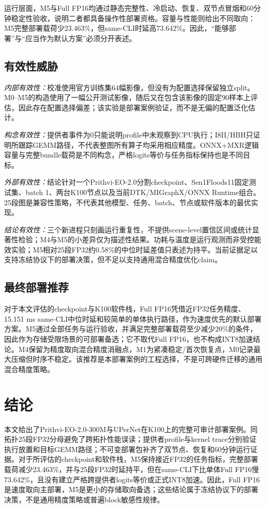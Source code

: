 \documentclass[conference]{IEEEtran}
\begin{document}
运行层面，M5与Full FP16均通过静态完整性、冷启动、恢复、双节点冒烟和60分钟稳定性验收，说明二者都具备操作性部署资格。容量与性能则给出不同取向：M5完整部署载荷少23.463\%，但same-CLI时延高73.642\%。因此，“能够部署”与“应当作为默认方案”必须分开表述。

\subsection{有效性威胁}

\textit{内部有效性：}校准使用官方训练集64幅影像，但没有为配置选择保留独立split。M0--M5的构造使用了一幅公开测试影像，随后又在包含该影像的固定90样本上评估，因此存在配置选择偏差；该实验是部署案例验证，而不是无偏的配置泛化估计。

\textit{构念有效性：}提供者事件为0只能说明profile中未观察到CPU执行；I8II/HBH只证明所跟踪GEMM路径，不代表整图所有算子均采用相应精度。ONNX+MXR逻辑容量与完整bundle载荷是不同构念，严格logits等价与任务指标保持也是不同目标。

\textit{外部有效性：}结论针对一个Prithvi-EO-2.0分割checkpoint、Sen1Floods11固定测试集、batch 1、两台K100节点以及当前DTK/MIGraphX/ONNX Runtime组合。25段图是兼容性策略，不代表其他模型、任务、batch、节点或软件版本的最优实现。

\textit{结论有效性：}三个新进程只刻画运行重复性，不提供scene-level置信区间或统计显著性检验；M4与M5的小差异仅为描述性结果。功耗与温度是运行观测而非受控能效实验；M5相对25段FP32约0.58\%的中位时延差值只表述为持平。当前证据足以支持冻结协议下的部署决策，但不足以支持通用混合精度优化claim。

\subsection{最终部署推荐}

对于本文评估的checkpoint与K100软件栈，Full FP16凭借近FP32任务精度、15.151 ms same-CLI中位时延和较简单的单体执行路径，作为速度优先的默认部署方案。M5通过全部任务与运行验收，并满足完整部署载荷至少减少20\%的条件，因此作为存储受限场景的可部署备选；它不取代Full FP16，也不构成INT8加速结论。M4保留为精度取向混合精度消融点，M1为紧凑稳定/首次恢复点，M0记录最大压缩但时序不稳定。该推荐是本部署案例的工程选择，不是可跨硬件迁移的通用混合精度策略。

\section{结论}

本文给出了Prithvi-EO-2.0-300M与UPerNet在K100上的完整可审计部署案例。同拓扑25段FP32分母避免了跨拓扑性能误读；提供者profile与kernel trace分别验证执行放置和目标GEMM路径；不可变部署包补齐了双节点、恢复和60分钟运行证据。对于所评估的checkpoint和软件栈，M5保持接近FP32的任务指标，完整部署载荷减少23.463\%，并与25段FP32时延持平，但在same-CLI下比单体Full FP16慢73.642\%，且没有建立严格跨提供者logits等价或正式INT8加速。因此，Full FP16是速度取向主部署，M5是更小的存储取向备选；这些结论属于冻结协议下的部署决策，不是通用精度策略或普遍block敏感性规律。

\balance


\end{document}
